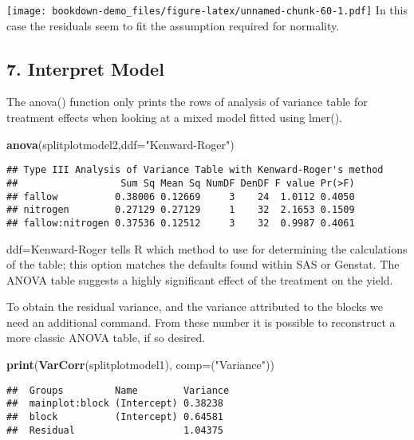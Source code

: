 \documentclass[]{book}
\newenvironment{Shaded}{\begin{snugshade}}{\end{snugshade}}
\newcommand{\KeywordTok}[1]{\textcolor[rgb]{0.13,0.29,0.53}{\textbf{#1}}}
\newcommand{\DataTypeTok}[1]{\textcolor[rgb]{0.13,0.29,0.53}{#1}}
\newcommand{\StringTok}[1]{\textcolor[rgb]{0.31,0.60,0.02}{#1}}
\newcommand{\NormalTok}[1]{#1}
\theoremstyle{definition}
\theoremstyle{definition}
\theoremstyle{definition}
\theoremstyle{remark}
\begin{document}
\texttt{[image: bookdown-demo\_files/figure-latex/unnamed-chunk-60-1.pdf]}
In this case the residuals seem to fit the assumption required for
normality.

\subsection{7. Interpret Model}\label{interpret-model-1}

The anova() function only prints the rows of analysis of variance table
for treatment effects when looking at a mixed model fitted using lmer().

\begin{Shaded}
\begin{Highlighting}[]
\KeywordTok{anova}\NormalTok{(splitplotmodel2,}\DataTypeTok{ddf=}\StringTok{"Kenward-Roger"}\NormalTok{)}
\end{Highlighting}
\end{Shaded}

\begin{verbatim}
## Type III Analysis of Variance Table with Kenward-Roger's method
##                  Sum Sq Mean Sq NumDF DenDF F value Pr(>F)
## fallow          0.38006 0.12669     3    24  1.0112 0.4050
## nitrogen        0.27129 0.27129     1    32  2.1653 0.1509
## fallow:nitrogen 0.37536 0.12512     3    32  0.9987 0.4061
\end{verbatim}

ddf=Kenward-Roger tells R which method to use for determining the
calculations of the table; this option matches the defaults found within
SAS or Genstat. The ANOVA table suggests a highly significant effect of
the treatment on the yield.

To obtain the residual variance, and the variance attributed to the
blocks we need an additional command. From these number it is possible
to reconstruct a more classic ANOVA table, if so desired.

\begin{Shaded}
\begin{Highlighting}[]
\KeywordTok{print}\NormalTok{(}\KeywordTok{VarCorr}\NormalTok{(splitplotmodel1), }\DataTypeTok{comp=}\NormalTok{(}\StringTok{"Variance"}\NormalTok{))}
\end{Highlighting}
\end{Shaded}

\begin{verbatim}
##  Groups         Name        Variance
##  mainplot:block (Intercept) 0.38238 
##  block          (Intercept) 0.64581 
##  Residual                   1.04375
\end{verbatim}
\end{document}
